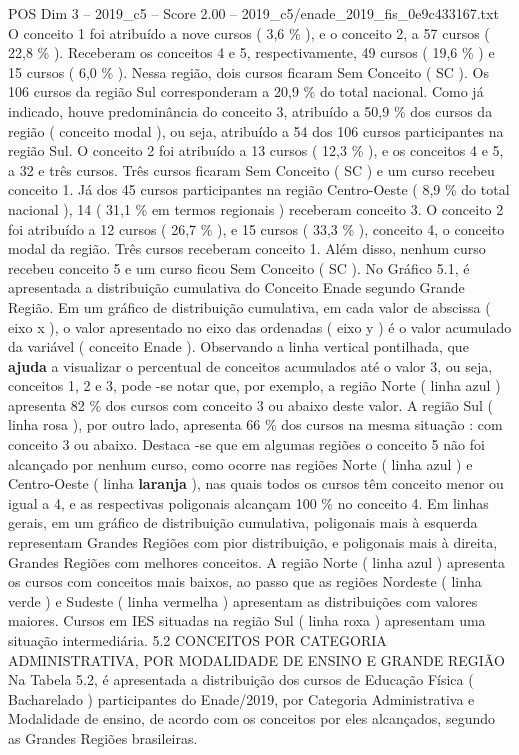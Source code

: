 \begin{textsample}{POS Dim 3 – 2019\_c5 – Score 2.00 – 2019\_c5/enade\_2019\_fis\_0e9c433167.txt}
O conceito 1 foi atribuído a nove cursos ( 3,6 \% ), e o conceito 2, a 57 cursos ( 22,8 \% ).
Receberam os conceitos 4 e 5, respectivamente, 49 cursos ( 19,6 \% ) e 15 cursos ( 6,0 \% ).
Nessa região, dois cursos ficaram Sem Conceito ( SC ).
Os 106 cursos da região Sul corresponderam a 20,9 \% do total nacional.
Como já indicado, houve predominância do conceito 3, atribuído a 50,9 \% dos cursos da região ( conceito modal ), ou seja, atribuído a 54 dos 106 cursos participantes na região Sul.
O conceito 2 foi atribuído a 13 cursos ( 12,3 \% ), e os conceitos 4 e 5, a 32 e três cursos.
Três cursos ficaram Sem Conceito ( SC ) e um curso recebeu conceito 1.
Já dos 45 cursos participantes na região Centro-Oeste ( 8,9 \% do total nacional ), 14 ( 31,1 \% em termos regionais ) receberam conceito 3.
O conceito 2 foi atribuído a 12 cursos ( 26,7 \% ), e 15 cursos ( 33,3 \% ), conceito 4, o conceito modal da região.
Três cursos receberam conceito 1.
Além disso, nenhum curso recebeu conceito 5 e um curso ficou Sem Conceito ( SC ).
No Gráfico 5.1, é apresentada a distribuição cumulativa do Conceito Enade segundo Grande Região.
Em um gráfico de distribuição cumulativa, em cada valor de abscissa ( eixo x ), o valor apresentado no eixo das ordenadas ( eixo y ) é o valor acumulado da variável ( conceito Enade ).
Observando a linha vertical pontilhada, que \textbf{ajuda} a visualizar o percentual de conceitos acumulados até o valor 3, ou seja, conceitos 1, 2 e 3, pode -se notar que, por exemplo, a região Norte ( linha azul ) apresenta 82 \% dos cursos com conceito 3 ou abaixo deste valor.
A região Sul ( linha rosa ), por outro lado, apresenta 66 \% dos cursos na mesma situação : com conceito 3 ou abaixo.
Destaca -se que em algumas regiões o conceito 5 não foi alcançado por nenhum curso, como ocorre nas regiões Norte ( linha azul ) e Centro-Oeste ( linha \textbf{laranja} ), nas quais todos os cursos têm conceito menor ou igual a 4, e as respectivas poligonais alcançam 100 \% no conceito 4.
Em linhas gerais, em um gráfico de distribuição cumulativa, poligonais mais à esquerda representam Grandes Regiões com pior distribuição, e poligonais mais à direita, Grandes Regiões com melhores conceitos.
A região Norte ( linha azul ) apresenta os cursos com conceitos mais baixos, ao passo que as regiões Nordeste ( linha verde ) e Sudeste ( linha vermelha ) apresentam as distribuições com valores maiores.
Cursos em IES situadas na região Sul ( linha roxa ) apresentam uma situação intermediária. 5.2 CONCEITOS POR CATEGORIA ADMINISTRATIVA, POR MODALIDADE DE ENSINO E GRANDE REGIÃO Na Tabela 5.2, é apresentada a distribuição dos cursos de Educação Física ( Bacharelado ) participantes do Enade/2019, por Categoria Administrativa e Modalidade de ensino, de acordo com os conceitos por eles alcançados, segundo as Grandes Regiões brasileiras.

\end{textsample}
